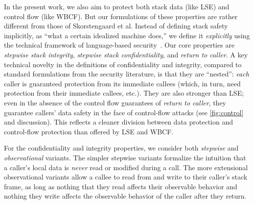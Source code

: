 \documentclass[acmsmall,review,anonymous]{acmart}\settopmatter{printfolios=true,printccs=false,printacmref=false}
\begin{document}
In the present work, we also aim to protect both stack data (like
LSE) and
control flow (like WBCF).  But our formulations of these properties are
rather different from those of Skorstengaard et al.  Instead of
defining stack safety implicitly,
as ``what a certain idealized machine does,'' we define it
\emph{explicitly} using the technical framework of language-based
security\ifaftersubmission~\citep{??}\fi.
Our core properties are \emph{stepwise stack integrity},
\emph{stepwise stack confidentiality}, and \emph{return to caller}.
%
A key technical novelty in the definitions of confidentiality and integrity,
compared to standard formulations from the security literature, is that they
are ``nested'': {\em each} caller is guaranteed protection from its
immediate callees (which, in turn, need protection from their immediate
callees, etc.). They are also stronger than LSE; even in the absence of the
control flow guarantees of {\em return to caller}, they guarantee callers'
data safety in the face of control-flow attacks (see \cref{fig:control} and discussion).
This reflects a cleaner division between data protection and control-flow protection
than offered by LSE and WBCF.

For the confidentiality and integrity properties, we consider both {\em
  stepwise} and {\em observational} variants.  The simpler {stepwise}
variants formalize the intuition that a caller's local data is {\em never}
read or modified during a call. The more extensional observational variants
allow a callee to read from and write to their caller's stack frame, as
long as nothing that they read affects their observable behavior and nothing
they write affects the observable behavior of the caller after they return.

\end{document}
